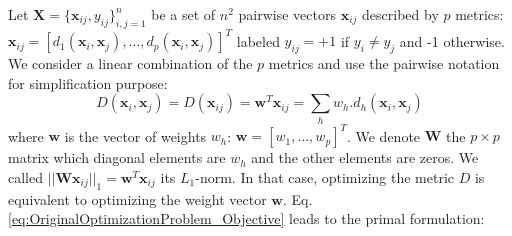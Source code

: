 
Let $\textbf{X} = \{\textbf{x}_{ij},y_{ij}\}_{i,j=1}^n$ be a set of $n^2$ pairwise vectors $\textbf{x}_{ij}$ described by $p$ metrics: $\textbf{x}_{ij}=[d_1(\textbf{x}_i,\textbf{x}_j), ..., d_p(\textbf{x}_i,\textbf{x}_j)]^T$ labeled $y_{ij} = +1$ if $y_i \neq y_j$ and -1 otherwise. We consider a linear combination of the $p$ metrics and use the pairwise notation for simplification purpose:
\begin{equation}
D(\textbf{x}_i,\textbf{x}_j) = D(\textbf{x}_{ij})=\textbf{w}^T\textbf{x}_{ij} = \sum_h w_h.d_h(\textbf{x}_i,\textbf{x}_j)
\label{eq:D_linear}
\end{equation}
where $\textbf{w}$ is the vector of weights $w_h$: $\textbf{w}=[w_1, \ldots, w_p]^T$. We denote $\textbf{W}$ the $p \times p$ matrix which diagonal elements are $w_h$ and the other elements are zeros. We called $||\textbf{W}\textbf{x}_{ij}||_1 = \textbf{w}^T \textbf{x}_{ij}$ its $L_1$-norm. In that case, optimizing the metric $D$ is equivalent to optimizing the weight vector $\textbf{w}$. Eq. \ref{eq:OriginalOptimizationProblem_Objective} leads to the primal formulation:

